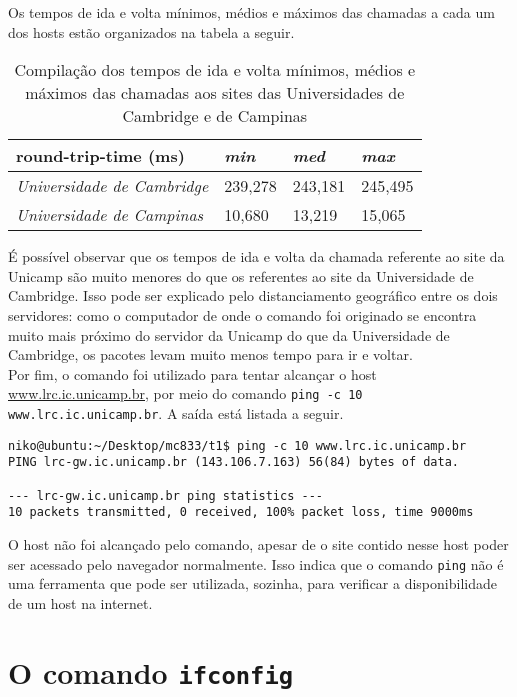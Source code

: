\documentclass[a4paper,10pt]{article}
\begin{document}
Os tempos de ida e volta mínimos, médios e máximos das chamadas a cada um dos hosts estão organizados na tabela a seguir.

\begin{table}[]
\centering
\label{my-label}
\begin{tabular}{l|l|l|l}
{\textbf{round-trip-time (ms)}}      & \textit{min} & \textit{med} & \textit{max} \\ \hline
\textit{Universidade de Cambridge} & 239,278      & 243,181      & 245,495      \\ \hline
\textit{Universidade de Campinas}  & 10,680       & 13,219       & 15,065      
\end{tabular}
\caption{Compilação dos tempos de ida e volta mínimos, médios e máximos das chamadas aos sites das Universidades de Cambridge e de Campinas}
\end{table}

É possível observar que os tempos de ida e volta da chamada referente ao site da Unicamp são muito menores do que os referentes ao site da Universidade de Cambridge. Isso pode ser explicado pelo distanciamento geográfico entre os dois servidores: como o computador de onde o comando foi originado se encontra muito mais próximo do servidor da Unicamp do que da Universidade de Cambridge, os pacotes levam muito menos tempo para ir e voltar.\\

Por fim, o comando foi utilizado para tentar alcançar o host \url{www.lrc.ic.unicamp.br}, por meio do comando {\tt ping -c 10 www.lrc.ic.unicamp.br}. A saída está listada a seguir.\\

\begin{lstlisting}
niko@ubuntu:~/Desktop/mc833/t1$ ping -c 10 www.lrc.ic.unicamp.br
PING lrc-gw.ic.unicamp.br (143.106.7.163) 56(84) bytes of data.

--- lrc-gw.ic.unicamp.br ping statistics ---
10 packets transmitted, 0 received, 100% packet loss, time 9000ms
\end{lstlisting}

O host não foi alcançado pelo comando, apesar de o site contido nesse host poder ser acessado pelo navegador normalmente. Isso indica que o comando {\tt ping} não é uma ferramenta que pode ser utilizada, sozinha, para verificar a disponibilidade de um host na internet.

\section{O comando {\tt ifconfig}}
\end{document}
